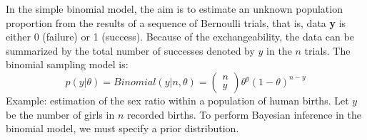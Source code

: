 \documentclass {article}
\begin{document}
In the simple binomial model, the aim is to estimate an unknown population proportion from the results of a sequence of Bernoulli trials, that is, data \textbf{y} is either 0 (failure) or 1 (success).
Because of the exchangeability, the data can be summarized by the total number of successes denoted by $y$ in the $n$ trials. 
The binomial sampling model is:
\begin {equation*}
p(y | \theta) = Binomial (y|n, \theta )= \begin{pmatrix} 
n \\
y
\end{pmatrix}
\theta ^ {y} (1 - \theta) ^{n-y}
\end {equation*} 
Example: estimation of the sex ratio within a population of human births.
Let $y$ be the number of girls in $n$ recorded births.
To perform Bayesian inference in the binomial model, we must specify a prior distribution.   
   
\end{document}
